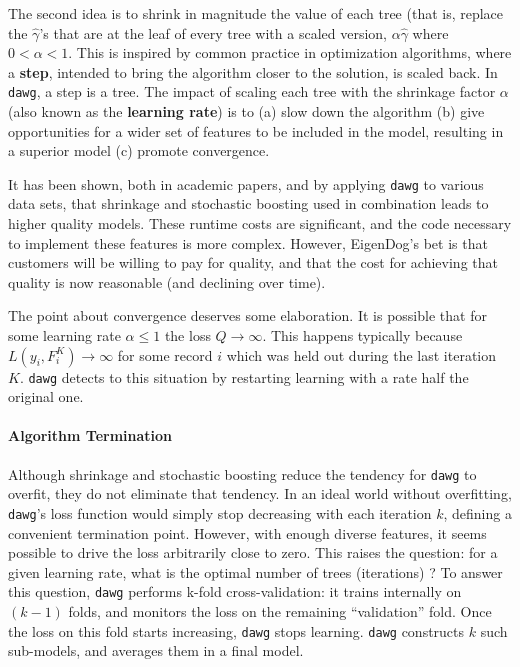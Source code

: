 \documentclass{article}
\begin{document}
The second idea is to shrink in magnitude the value of each tree (that
is, replace the $\hat \gamma$'s that are at the leaf of every tree
with a scaled version, $\alpha \hat \gamma$ where $0 < \alpha < 1$.
This is inspired by common practice in optimization algorithms, where
a {\bf step}, intended to bring the algorithm closer to the solution,
is scaled back.  In \texttt{dawg}, a step is a tree.  The impact of
scaling each tree with the shrinkage factor $\alpha$ (also known as
the {\bf learning rate}) is to (a) slow down the algorithm (b) give
opportunities for a wider set of features to be included in the model,
resulting in a superior model (c) promote convergence.

It has been shown, both in academic papers, and by applying
\texttt{dawg} to various data sets, that shrinkage and stochastic
boosting used in combination leads to higher quality models.  These
runtime costs are significant, and the code necessary to implement
these features is more complex.  However, EigenDog's bet is that
customers will be willing to pay for quality, and that the cost for
achieving that quality is now reasonable (and declining over time).

The point about convergence deserves some elaboration.  It is possible
that for some learning rate $\alpha \le 1$ the loss $Q \rightarrow
\infty$.  This happens typically because $L(y_i, F_i^K) \rightarrow
\infty$ for some record $i$ which was held out during the last
iteration $K$.  \texttt{dawg} detects to this situation by restarting
learning with a rate half the original one.

\paragraph{Algorithm Termination}

Although shrinkage and stochastic boosting reduce the tendency for
\texttt{dawg} to overfit, they do not eliminate that tendency.  In an
ideal world without overfitting, \texttt{dawg}'s loss function would
simply stop decreasing with each iteration $k$, defining a convenient
termination point.  However, with enough diverse features, it seems
possible to drive the loss arbitrarily close to zero.  This raises the
question: for a given learning rate, what is the optimal number of
trees (iterations) ?  To answer this question, \texttt{dawg} performs
k-fold cross-validation: it trains internally on $(k-1)$ folds, and
monitors the loss on the remaining ``validation'' fold.  Once the loss
on this fold starts increasing, \texttt{dawg} stops learning.
\texttt{dawg} constructs $k$ such sub-models, and averages them in a
final model.
\end{document}
